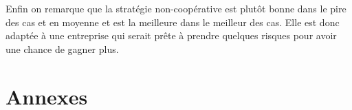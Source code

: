 \documentclass{scrartcl}
\begin{document}
    Enfin on remarque que la stratégie non-coopérative est plutôt bonne dans le
    pire des cas et en moyenne et est la meilleure dans le meilleur des cas.
    Elle est donc adaptée à une entreprise qui serait prête à prendre quelques
    risques pour avoir une chance de gagner plus.
    
\section{Annexes}
  \lstlistoflistings
  
  
  
  
  
  
  
\end{document}
